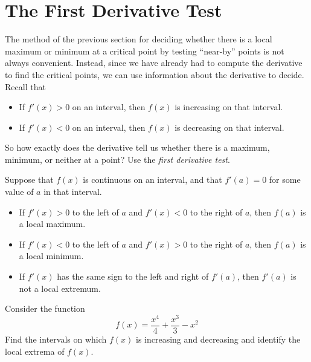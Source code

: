 \section{The First Derivative Test}

The method of the previous section for deciding whether there is a
local maximum or minimum at a critical point by testing ``near-by''
points is not always convenient. Instead, since we have already had to
compute the derivative to find the critical points, we can use
information about the derivative to decide. Recall that
\begin{itemize}
\item If $f'(x) >0$ on an interval, then $f(x)$ is increasing on that interval.
\item If $f'(x) <0$ on an interval, then $f(x)$ is decreasing on that interval.
\end{itemize}

So how exactly does the derivative tell us whether there is a maximum,
minimum, or neither at a point? Use the \textit{first derivative test}.
\begin{mainTheorem}\label{T:fdt}\hfil
Suppose that $f(x)$ is continuous on an interval, and that $f'(a)=0$
for some value of $a$ in that interval.
\begin{itemize}
\item If $f'(x)>0$ to the left of $a$ and $f'(x)<0$ to the right of
  $a$, then $f(a)$ is a local maximum.
\item If $f'(x)<0$ to the left of $a$ and $f'(x)>0$ to the right of
  $a$, then $f(a)$ is a local minimum.
\item If $f'(x)$ has the same sign to the left and right of $f'(a)$,
  then $f'(a)$ is not a local extremum.
\end{itemize}
\end{mainTheorem}

\begin{example}\label{E:localextrema}
Consider the function 
\[
f(x) = \frac{x^4}{4}+\frac{x^3}{3}-x^2
\]
Find the intervals on which $f(x)$ is increasing and decreasing and
identify the local extrema of $f(x)$.
\end{example}

